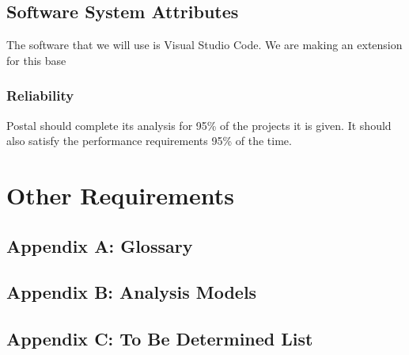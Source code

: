 \documentclass[letterpaper,10pt,titlepage,draftclsnofoot,onecolumn,onesided] {IEEEtran}
\begin{document}
\subsection{Software System Attributes}
The software that we will use is Visual Studio Code. We are making an extension for this base

\subsubsection{Reliability}
Postal should complete its analysis for 95\% of the projects it is given. It should also satisfy the performance requirements 95\% of the time.   


\section{Other Requirements}

\subsection{Appendix A: Glossary}

\subsection{Appendix B: Analysis Models}

\subsection{Appendix C: To Be Determined List}
\end{document}
